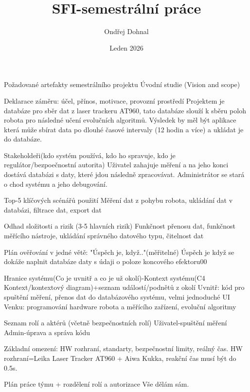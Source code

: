 



\worktype [O/CZ]
\title {SFI-semestrální práce}
\author {Ondřej Dohnal}
\date {Leden 2026}


\makefront
\chap Požadované artefakty semestrálního projektu
\sec Úvodní studie (Vision and scope)

\secc Deklarace záměru: účel, přínos, motivace, provozní prostředí
Projektem je databáze pro sběr dat z laser trackeru AT960, tato databáze slouží k sběru poloh robota pro následné učení evolučních algoritmů.
Výsledek by měl být aplikace která může sbírat data po dlouhé časové intervaly (12 hodin a více) a ukládat je do databáze.

\secc Stakeholdeři(kdo systém používá, kdo ho spravuje, kdo je regulátor/bezpoečnostní autorita)
Uživatel zahajuje měření a na jeho konci dostává databázi s daty, které jdou následně zpracovávat.
Administrátor se stará o chod systému a jeho debugování.

\secc Top-5 klíčových scénářů použití
Měření dat z pohybu robota, ukládání dat v databázi, filtrace dat, export dat

\secc Odhad složitosti a rizik (3-5 hlavních rizik)
Funkčnost přenosu dat, funkčnost měřícího nástroje, ukládání správného datového typu, čitelnost dat

\secc Plán ověřování v jedné větě: "Úspěch je, když.."(měřitelné)
Úspěch je když se dokáže naplnit databáze daty s údaji o poloze koncového efektoru00

\secc Hranice systému(Co je uvnitř a co je už okolí)-Kontext systému(C4 Kontext/kontextový diagram)+seznam událostí/podnětů z okolí
Uvnitř: kód pro spuštění měření, přenos dat do databázového systému, velmi jednoduché UI 
Venku: programování hardware robota a měřícího zařízení, evoluční algoritmy

\secc Seznam rolí a aktérů (včetně bezpečnostních rolí)
Uživatel-spuštění měření
Admin-úprava a správa kódu

\secc Základní omezení: HW rozhraní, standarty, bezpečnostní limity, reálný čas.
HW rozhraní=Leika Laser Tracker AT960 + Aiwa Kukka, reakční čas musí být do 0.5s.

\secc Plán práce týmu + rozdělení rolí a autorizace
Vše dělám sám.


